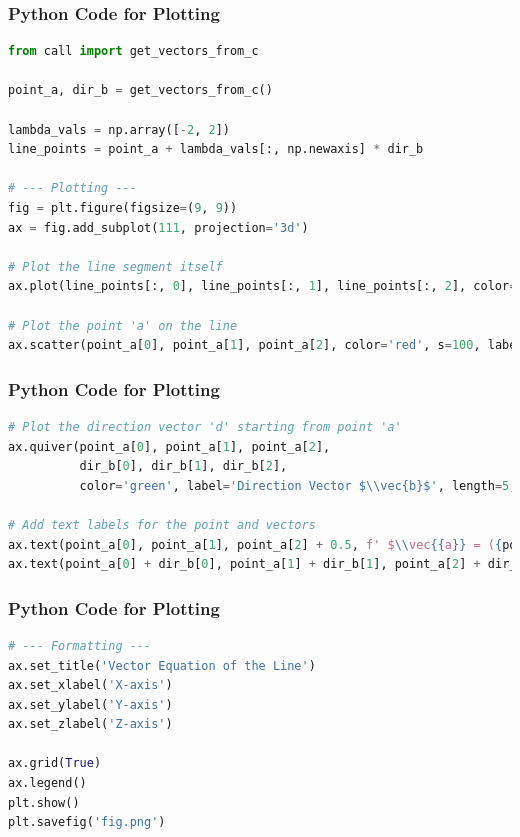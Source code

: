 \documentclass{beamer}
\theoremstyle{remark}
\let\vec\mathbf
\numberwithin{equation}{section}
\begin{document}
\begin{frame}[fragile]
\frametitle{Python Code for Plotting}
\begin{lstlisting}[language=Python]
from call import get_vectors_from_c

point_a, dir_b = get_vectors_from_c()
 
lambda_vals = np.array([-2, 2])
line_points = point_a + lambda_vals[:, np.newaxis] * dir_b

# --- Plotting ---
fig = plt.figure(figsize=(9, 9))
ax = fig.add_subplot(111, projection='3d')

# Plot the line segment itself
ax.plot(line_points[:, 0], line_points[:, 1], line_points[:, 2], color='blue', label='The Line')

# Plot the point 'a' on the line
ax.scatter(point_a[0], point_a[1], point_a[2], color='red', s=100, label='Point $\\vec{a}$')

\end{lstlisting}
\end{frame}

\begin{frame}[fragile]
\frametitle{Python Code for Plotting}
\begin{lstlisting}[language=Python]
  # Plot the direction vector 'd' starting from point 'a'
ax.quiver(point_a[0], point_a[1], point_a[2], 
          dir_b[0], dir_b[1], dir_b[2], 
          color='green', label='Direction Vector $\\vec{b}$', length=5, arrow_length_ratio=0.3)

# Add text labels for the point and vectors
ax.text(point_a[0], point_a[1], point_a[2] + 0.5, f' $\\vec{{a}} = ({point_a[0]:.0f}, {point_a[1]:.0f}, {point_a[2]:.0f})$')
ax.text(point_a[0] + dir_b[0], point_a[1] + dir_b[1], point_a[2] + dir_b[2], ' $\\vec{b}$')
\end{lstlisting}
\end{frame}

\begin{frame}[fragile]
\frametitle{Python Code for Plotting}
\begin{lstlisting}[language=Python]
# --- Formatting ---
ax.set_title('Vector Equation of the Line')
ax.set_xlabel('X-axis')
ax.set_ylabel('Y-axis')
ax.set_zlabel('Z-axis')

ax.grid(True)
ax.legend()
plt.show()
plt.savefig('fig.png')
\end{lstlisting}
\end{frame}
\end{document}
